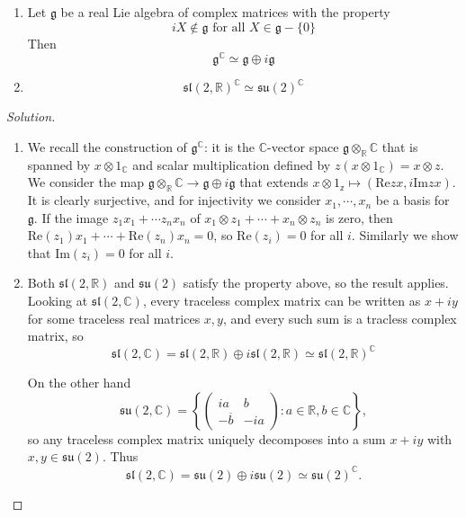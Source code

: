 \documentclass{report}
\begin{document}
\begin{exercise}[Exercise I.4]
    \begin{enumerate}
        \item Let $\mathfrak g$ be a real Lie algebra of complex matrices with the property
        \[
        iX \not \in \mathfrak g \text{ for all } X \in \mathfrak g - \{0 \}
        \]
        Then
        \[
        \mathfrak g^\mathbb C \simeq \mathfrak g \oplus i\mathfrak g
        \]
        \item
        \[
        \mathfrak{sl}(2,\mathbb R)^\mathbb C \simeq \mathfrak{su}(2)^\mathbb C
        \]
    \end{enumerate}
\end{exercise}
\begin{proof}[Solution]
    \begin{enumerate}
        \item
        We recall the construction of $\mathfrak g^\mathbb C$: it is the $\mathbb C$-vector space $\mathfrak g \otimes_\mathbb R \mathbb C$ that is spanned by $x \otimes 1_\mathbb C$ and scalar multiplication defined by $z \left(x \otimes 1_\mathbb C\right) = x \otimes z$.
        We consider the map $\mathfrak g \otimes_\mathbb R \mathbb C \to \mathfrak g \oplus i\mathfrak g$ that extends $x \otimes 1_\mathbb z \mapsto (\mathrm{Re}z x, i\mathrm{Im}z x)$.
        It is clearly surjective, and for injectivity we consider $x_1, \cdots, x_n$ be a basis for $\mathfrak g$.
        If the image $z_1 x_1 + \cdots z_n x_n$ of $x_1 \otimes z_1 + \cdots + x_n \otimes z_n$ is zero, then $\mathrm{Re}(z_1)x_1 + \cdots + \mathrm{Re}(z_n)x_n = 0$, so $\mathrm{Re}(z_i) = 0$ for all $i$.
        Similarly we show that $\mathrm{Im}(z_i) = 0$ for all $i$.
        \item Both $\mathfrak{sl}(2, \mathbb R)$ and $\mathfrak{su}(2)$ satisfy the property above, so the result applies.
        Looking at $\mathfrak{sl}(2,\mathbb C)$, every traceless complex matrix can be written as $x + iy$ for some traceless real matrices $x, y$, and every such sum is a tracless complex matrix, so 
        \[
        \mathfrak{sl}(2, \mathbb C) = \mathfrak{sl}(2, \mathbb R) \oplus i\mathfrak{sl}(2, \mathbb R) \simeq \mathfrak{sl}(2,\mathbb R)^\mathbb C
        \]

        On the other hand
        \[
        \mathfrak{su}(2,\mathbb C) = \left\{\begin{pmatrix}
            ia & b\\
            -\overline{b} & -ia
        \end{pmatrix}: a \in \mathbb R, b \in \mathbb C\right\},
        \]
        so any traceless complex matrix uniquely decomposes into a sum $x + iy$ with $x, y \in \mathfrak{su}(2)$.
        Thus
        \[
        \mathfrak{sl}(2,\mathbb C) = \mathfrak{su}(2) \oplus i \mathfrak{su}(2) \simeq \mathfrak{su}(2)^\mathbb C.
        \]
    \end{enumerate}
\end{proof}
\end{document}
